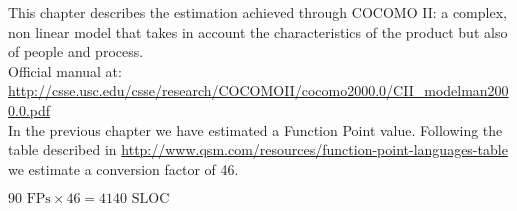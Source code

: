 This chapter describes the estimation achieved through COCOMO II: a complex, non linear model that takes in account the characteristics of the product but also of people and process.\\

Official manual at: {\small \url{http://csse.usc.edu/csse/research/COCOMOII/cocomo2000.0/CII_modelman2000.0.pdf}}\\

In the previous chapter we have estimated a Function Point value. Following the table described in {\small \url{http://www.qsm.com/resources/function-point-languages-table}} we estimate a conversion factor of 46.

\begin{center}
	$90\textrm{ FPs} \times 46 = 4140 \textrm{ SLOC}$
\end{center}